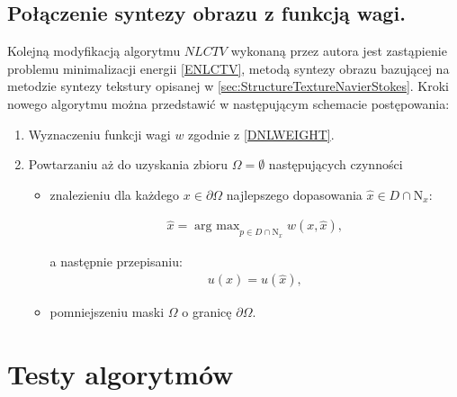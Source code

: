 \documentclass[12pt, twoside, openany]{report}
\theoremstyle{definition}
\begin{document}
\section{Połączenie syntezy obrazu z funkcją wagi.}
Kolejną modyfikacją algorytmu $NLCTV$ wykonaną przez autora jest zastąpienie problemu minimalizacji energii \eqref{ENLCTV}, metodą syntezy obrazu bazującej na metodzie syntezy tekstury opisanej w \autoref{sec:StructureTextureNavierStokes}. Kroki nowego algorytmu można przedstawić w następującym schemacie postępowania:
\begin{enumerate}
\item
Wyznaczeniu funkcji wagi $w$ zgodnie z \eqref{DNLWEIGHT}.
\item
Powtarzaniu aż do uzyskania zbioru $\Omega = \emptyset$ następujących czynności
\begin{itemize}
\item
znalezieniu dla każdego $x \in \partial\Omega$ najlepszego dopasowania $\hat{x} \in D \cap \mathrm{N}_x$:
\begin{large}
\begin{align}
\hat{x} = \mathop{\mathrm{arg \ max}}_{p \in D \cap \mathrm{N}_x} w(x,\hat{x}),
\end{align}
\end{large}
a następnie przepisaniu:
\begin{align}
u(x) = \hat{u}(\hat{x}),
\end{align}
\item
pomniejszeniu maski $\Omega$ o granicę $\partial\Omega$.
\end{itemize}
\end{enumerate}
\chapter{Testy algorytmów}
\end{document}
